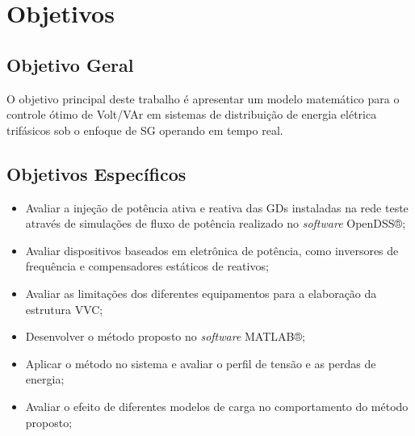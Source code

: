 \documentclass[]{IEEEphot}
\begin{document}

\section{Objetivos}
\subsection{Objetivo Geral}
O objetivo principal deste trabalho é apresentar um modelo matemático para o controle ótimo de Volt/VAr em sistemas de distribuição de energia elétrica trifásicos sob o enfoque de SG operando em tempo real.
\subsection{Objetivos Específicos}
	\begin{itemize}
	\item Avaliar a injeção de potência ativa e reativa das GDs instaladas na rede teste através de simulações de fluxo de potência realizado no \textit{software} OpenDSS®;
	\item Avaliar dispositivos baseados em eletrônica de potência, como inversores de frequência e compensadores estáticos de reativos;
	\item Avaliar as limitações dos diferentes equipamentos para a elaboração da estrutura VVC;
	\item Desenvolver o método proposto no \textit{software} MATLAB®;
	\item Aplicar o método no sistema e avaliar o perfil de tensão e as perdas de energia;
	\item Avaliar o efeito de diferentes modelos de carga no comportamento do método proposto; 

\end{itemize}
\end{document}
